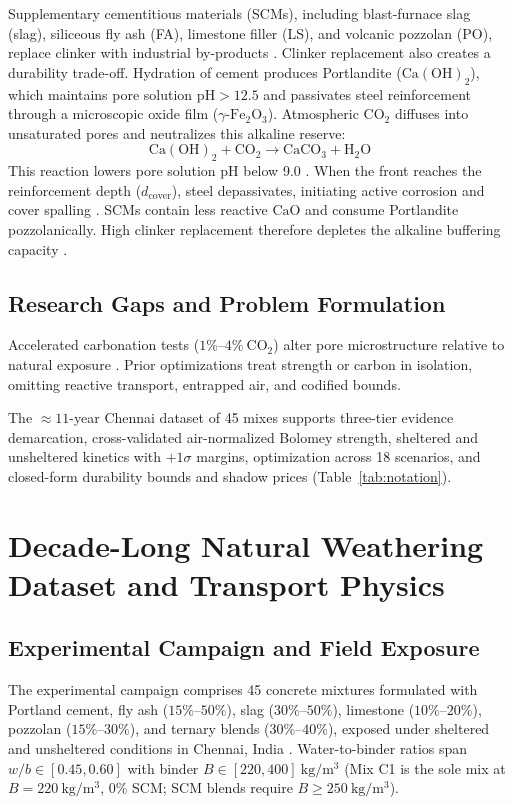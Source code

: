 \documentclass[journal]{IEEEtran}
\begin{document}
Supplementary cementitious materials (SCMs), including blast-furnace slag (slag), siliceous fly ash (FA), limestone filler (LS), and volcanic pozzolan (PO), replace clinker with industrial by-products \cite{scrivener2018, lothenbach2011}. Clinker replacement also creates a durability trade-off. Hydration of cement produces Portlandite ($\mathrm{Ca(OH)}_2$), which maintains pore solution $\mathrm{pH} > 12.5$ and passivates steel reinforcement through a microscopic oxide film ($\gamma\text{-}\mathrm{Fe}_2\mathrm{O}_3$). Atmospheric $\mathrm{CO}_2$ diffuses into unsaturated pores and neutralizes this alkaline reserve:
\begin{equation}
\mathrm{Ca(OH)}_2 + \mathrm{CO}_2 \to \mathrm{CaCO}_3 + \mathrm{H}_2\mathrm{O}
\label{eq:carbonation_rxn}
\end{equation}
This reaction lowers pore solution pH below 9.0 \cite{papadakis1991}. When the front reaches the reinforcement depth ($d_{\mathrm{cover}}$), steel depassivates, initiating active corrosion and cover spalling \cite{fib34, fib2020}. SCMs contain less reactive $\mathrm{CaO}$ and consume Portlandite pozzolanically. High clinker replacement therefore depletes the alkaline buffering capacity \cite{papadakis1992}.

\subsection{Research Gaps and Problem Formulation}
Accelerated carbonation tests ($1\%\text{--}4\%\ \mathrm{CO}_2$) alter pore microstructure relative to natural exposure \cite{vu2019, hule2024}. Prior optimizations treat strength or carbon in isolation, omitting reactive transport, entrapped air, and codified bounds.

The $\approx 11$-year Chennai dataset of 45 mixes \cite{hule2024, hule2024mendeley} supports three-tier evidence demarcation, cross-validated air-normalized Bolomey strength, sheltered and unsheltered kinetics with $+1\sigma$ margins, optimization across 18 scenarios, and closed-form durability bounds and shadow prices (Table~\ref{tab:notation}).



\section{Decade-Long Natural Weathering Dataset and Transport Physics}

\subsection{Experimental Campaign and Field Exposure}
The experimental campaign comprises 45 concrete mixtures formulated with Portland cement, fly ash ($15\%\text{--}50\%$), slag ($30\%\text{--}50\%$), limestone ($10\%\text{--}20\%$), pozzolan ($15\%\text{--}30\%$), and ternary blends ($30\%\text{--}40\%$), exposed under sheltered and unsheltered conditions in Chennai, India \cite{hule2024, hule2024mendeley}. Water-to-binder ratios span $w/b \in [0.45, 0.60]$ with binder $B \in [220, 400]\ \mathrm{kg/m^3}$ (Mix C1 is the sole mix at $B = 220\ \mathrm{kg/m^3}$, $0\%$ SCM; SCM blends require $B \ge 250\ \mathrm{kg/m^3}$).
\end{document}
